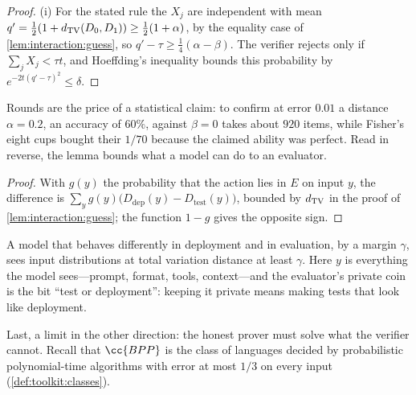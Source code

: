 \begin{refsection}
\begin{proof}
(i) For the stated rule the $X_j$ are independent with mean $q'=\frac12(1+d_{\mathrm{TV}}(D_0,D_1))\ge\frac12(1+\alpha)$, by the equality case of \cref{lem:interaction:guess}, so $q'-\tau\ge\frac14(\alpha-\beta)$. The verifier rejects only if $\sum_jX_j<\tau t$, and Hoeffding's inequality bounds this probability by $e^{-2t(q'-\tau)^2}\le\delta$.
\end{proof}

Rounds are the price of a statistical claim: to confirm at error $0.01$ a distance $\alpha=0.2$, an accuracy of $60\%$, against $\beta=0$ takes about $920$ items, while Fisher's eight cups bought their $1/70$ because the claimed ability was perfect. Read in reverse, the lemma bounds what a model can do to an evaluator.


\begin{proof}
With $g(y)$ the probability that the action lies in $E$ on input $y$, the difference is $\sum_yg(y)\bigl(D_{\mathrm{dep}}(y)-D_{\mathrm{test}}(y)\bigr)$, bounded by $d_{\mathrm{TV}}$ in the proof of \cref{lem:interaction:guess}; the function $1-g$ gives the opposite sign.
\end{proof}

A model that behaves differently in deployment and in evaluation, by a margin $\gamma$, sees input distributions at total variation distance at least $\gamma$. Here $y$ is everything the model sees---prompt, format, tools, context---and the evaluator's private coin is the bit ``test or deployment'': keeping it private means making tests that look like deployment.

Last, a limit in the other direction: the honest prover must solve what the verifier cannot. Recall that $\cc{BPP}$ is the class of languages decided by probabilistic polynomial-time algorithms with error at most $1/3$ on every input (\cref{def:toolkit:classes}).


\end{refsection}
